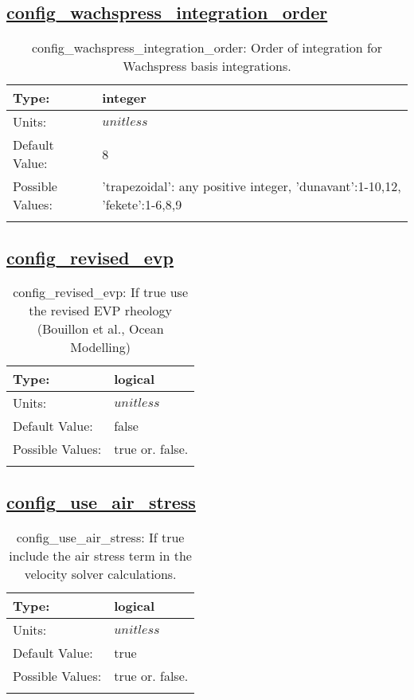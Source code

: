 \subsection[config\_wachspress\_integration\_order]{\hyperref[sec:nm_tab_velocity_solver]{config\_wachspress\_integration\_order}}
\label{subsec:nm_sec_config_wachspress_integration_order}
\begin{center}
\begin{longtable}{| p{2.0in} || p{4.0in} |}
    \hline
    Type: & integer \\
    \hline
    Units: & $unitless$ \\
    \hline
    Default Value: & 8 \\
    \hline
    Possible Values: & 'trapezoidal': any positive integer, 'dunavant':1-10,12, 'fekete':1-6,8,9 \\
    \hline
    \caption{config\_wachspress\_integration\_order: Order of integration for Wachspress basis integrations.}
\end{longtable}
\end{center}
\subsection[config\_revised\_evp]{\hyperref[sec:nm_tab_velocity_solver]{config\_revised\_evp}}
\label{subsec:nm_sec_config_revised_evp}
\begin{center}
\begin{longtable}{| p{2.0in} || p{4.0in} |}
    \hline
    Type: & logical \\
    \hline
    Units: & $unitless$ \\
    \hline
    Default Value: & false \\
    \hline
    Possible Values: & true or. false. \\
    \hline
    \caption{config\_revised\_evp: If true use the revised EVP rheology (Bouillon et al., Ocean Modelling)}
\end{longtable}
\end{center}
\subsection[config\_use\_air\_stress]{\hyperref[sec:nm_tab_velocity_solver]{config\_use\_air\_stress}}
\label{subsec:nm_sec_config_use_air_stress}
\begin{center}
\begin{longtable}{| p{2.0in} || p{4.0in} |}
    \hline
    Type: & logical \\
    \hline
    Units: & $unitless$ \\
    \hline
    Default Value: & true \\
    \hline
    Possible Values: & true or. false. \\
    \hline
    \caption{config\_use\_air\_stress: If true include the air stress term in the velocity solver calculations.}
\end{longtable}
\end{center}
